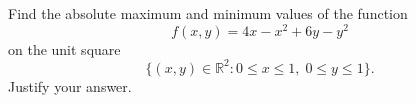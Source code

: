 \documentclass[11pt]{exam}
\newcommand{\R}{\mathbb{R}}
\begin{document}
\begin{questions}

\bonusquestion[12] Find the absolute maximum and minimum values of the function 
\[
    f(x,y) = 4 x - x^2 + 6 y - y^2
\] on the unit square
\[
    \{ (x,y) \in \R^2 \colon 0 \leq x \leq 1, \; 0 \leq y \leq 1 \}.
\]
Justify your answer.
\end{questions}
\end{document}

